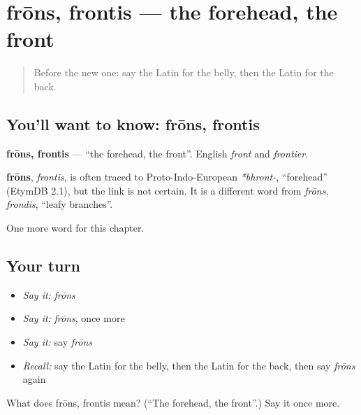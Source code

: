 \section[frōns, frontis]{frōns, frontis — the forehead, the front}

\label{lesson:LA-C65-frons}



\begin{quote}
Before the new one: say the Latin for the belly, then the Latin for the back.
\end{quote}

\subsection*{You'll want to know: frōns, frontis}
\textbf{frōns, frontis} — \textquotedblleft{}the forehead, the front\textquotedblright{}. English \emph{front} and \emph{frontier}.

\begin{cousinweb}
\textbf{frōns}, \emph{frontis}, is often traced to Proto-Indo-European \emph{*bhront-}, \textquotedblleft{}forehead\textquotedblright{} (EtymDB 2.1), but the link is not certain. It is a different word from \emph{frōns}, \emph{frondis}, \textquotedblleft{}leafy branches\textquotedblright{}.
\end{cousinweb}

\begin{grammarlens}[title={What you've built}]
One more word for this chapter.
\end{grammarlens}

\subsection*{Your turn}
\begin{itemize}
\raggedright
  \item \emph{Say it:} \emph{frōns}
  \item \emph{Say it:} \emph{frōns}, once more
  \item \emph{Say it:} say \emph{frōns}
  \item \emph{Recall:} say the Latin for the belly, then the Latin for the back, then say \emph{frōns} again
\end{itemize}

\begin{tcolorbox}[breakable,colback=teal!4,colframe=teal!35!black,title={Before you move on}]
What does frōns, frontis mean? (\textquotedblleft{}The forehead, the front\textquotedblright{}.) Say it once more.
\end{tcolorbox}
